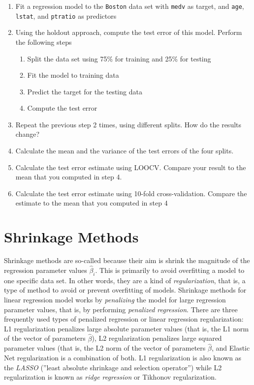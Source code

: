 \begin{withcode}
\begin{exerciseboxcomputer}
\begin{enumerate}
  \item Fit a regression model to the \texttt{Boston} data set with \texttt{medv} as target, and \texttt{age}, \texttt{lstat}, and \texttt{ptratio} as predictors
  \item Using the holdout approach, compute the test error of this model. Perform the following steps
  \begin{enumerate}
     \item Split the data set using 75\% for training and 25\% for testing
     \item Fit the model to training data
     \item Predict the target for the testing data
     \item Compute the test error
  \end{enumerate}
  \item Repeat the previous step 2 times, using different splits. How do the results change?
  \item Calculate the mean and the variance of the test errors of the four splits. 
  \item Calculate the test error estimate using LOOCV. Compare your result to the mean that you computed in step 4.
  \item Calculate the test error estimate using 10-fold cross-validation. Compare the estimate to the mean that you computed in step 4
\end{enumerate}
\end{exerciseboxcomputer}
\end{withcode}

\section{Shrinkage Methods}

Shrinkage methods are so-called because their aim is shrink the magnitude of the regression parameter values $\hat{\beta}_i$. This is primarily to avoid overfitting a model to one specific data set. In other words, they are a kind of \emph{regularization}, that is, a type of method to avoid or prevent overfitting of models. Shrinkage methods for linear regression model works by \emph{penalizing} the model for large regression parameter values, that is, by performing \emph{penalized regression}. There are three frequently used types of penalized regression or linear regression regularization: L1 regularization penalizes large absolute parameter values (that is, the L1 norm of the vector of parameters $\hat{\beta}$), L2 regularization penalizes large squared parameter values (that is, the L2 norm of the vector of parameters $\hat{\beta}$, and Elastic Net regularization is a combination of both. L1 regularization is also known as the \emph{LASSO} (''least absolute shrinkage and selection operator'') while L2 regularization is known as \emph{ridge regression} or Tikhonov regularization. 

